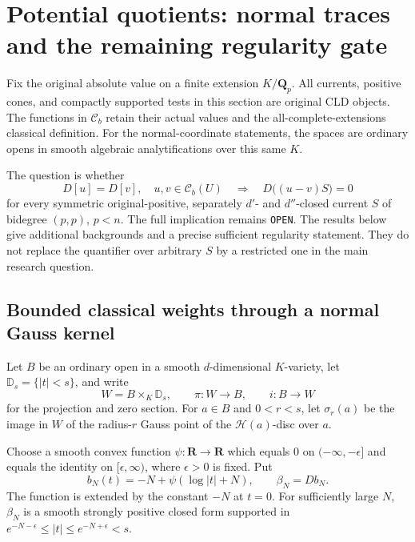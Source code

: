 \documentclass[11pt,a4paper]{article}
\numberwithin{equation}{section}
\theoremstyle{definition}
\theoremstyle{remark}
\newcommand{\Cb}{\mathcal C_b}
\begin{document}


\section{Potential quotients: normal traces and the remaining regularity gate}
\label{sec:r3-potential-quotient}

Fix the original absolute value on a finite extension $K/\mathbf Q_p$.
All currents, positive cones, and compactly supported tests in this
section are original CLD objects. The functions in $\Cb$ retain their
actual values and the all-complete-extensions classical definition.
For the normal-coordinate statements, the spaces are ordinary opens
in smooth algebraic analytifications over this same $K$.

The question is whether
\begin{equation}
 D[u]=D[v],\quad u,v\in\Cb(U)
 \quad\Longrightarrow\quad
 D\bigl((u-v)S\bigr)=0
 \label{eq:r3-general-potential-quotient}
\end{equation}
for every symmetric original-positive, separately $d'$- and
$d''$-closed current $S$ of bidegree $(p,p)$, $p<n$.
The full implication remains \texttt{OPEN}. The results below give
additional backgrounds and a precise sufficient regularity statement.
They do not replace the quantifier over arbitrary $S$ by a restricted
one in the main research question.

\subsection{Bounded classical weights through a normal Gauss kernel}

Let $B$ be an ordinary open in a smooth $d$-dimensional
$K$-variety, let $\mathbb D_s=\{|t|<s\}$, and write
\[
 W=B\times_K\mathbb D_s,\qquad
 \pi:W\longrightarrow B,\qquad i:B\longrightarrow W
\]
for the projection and zero section. For $a\in B$ and $0<r<s$,
let $\sigma_r(a)$ be the image in $W$ of the radius-$r$ Gauss
point of the $\mathscr H(a)$-disc over $a$.

Choose a smooth convex function $\psi:\mathbf R\to\mathbf R$
which equals $0$ on $(-\infty,-\epsilon]$ and equals the
identity on $[\epsilon,\infty)$, where $\epsilon>0$ is fixed.
Put
\[
 b_N(t)=-N+\psi(\log|t|+N),\qquad \beta_N=Db_N.
\]
The function is extended by the constant $-N$ at $t=0$.
For sufficiently large $N$, $\beta_N$ is a smooth strongly positive
closed form supported in
$e^{-N-\epsilon}\leq|t|\leq e^{-N+\epsilon}<s$.
\end{document}

